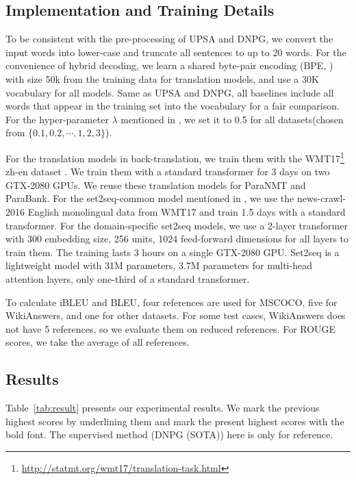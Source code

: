 \subsection{Implementation and Training Details} \label{sec:exset}
To be consistent with the pre-processing of UPSA and DNPG, we convert the input words into lower-case and truncate all sentences to up to 20 words. 
For the convenience of hybrid decoding, 
we learn a shared byte-pair encoding (BPE, \citet{sennrich2016edinburgh}) 
with size 50k from the training data for translation models, 
and use a 30K vocabulary for all models. Same as UPSA and DNPG, all baselines include all words that appear in the training set into the vocabulary for a fair comparison. For the hyper-parameter $\lambda$ mentioned in 
, we set it to 0.5 for all datasets(chosen from $\{0.1, 0.2, \cdots, 1, 2, 3\}$).

For the translation models in back-translation, we train them with the WMT17\footnote{\url{http://statmt.org/wmt17/translation-task.html}} zh-en dataset \citep{ziemski2016united}. We train them with a standard transformer for 3 days on two GTX-2080 GPUs. We reuse these translation models for ParaNMT and ParaBank. For the set2seq-common model mentioned in , we use the news-crawl-2016 English monolingual data from WMT17 and train 1.5 days with a standard transformer. For the domain-specific set2seq models, we use a 2-layer transformer with 300 embedding size, 256 units, 1024 feed-forward dimensions for all layers to train them. The training lasts 3 hours on a single GTX-2080 GPU. Set2seq is a lightweight model with 31M parameters, 3.7M parameters for multi-head attention layers, only one-third of a standard transformer.

To calculate iBLEU and BLEU, four references are used for MSCOCO, five for WikiAnswers, and one for other datasets. For some test cases, WikiAnswers does not have 5 references, so we evaluate them on reduced references. 
For ROUGE scores, we take the average of all references.

\subsection{Results} \label{sec:result}

Table~\ref{tab:result} presents our experimental results. We mark the previous highest scores by underlining them and mark the present highest scores with the bold font.
The supervised method (DNPG (SOTA)) here is only for reference.

